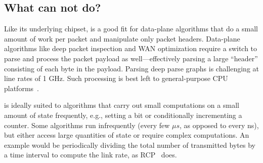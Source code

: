 \subsection{What can \absmachine not do?}
\label{ss:limitations}

Like its underlying chipset, \absmachine is a good fit for data-plane
algorithms that do a small amount of work per packet and manipulate
only packet headers. Data-plane algorithms like deep packet inspection
and WAN optimization require a switch to parse and process the packet
payload as well---effectively parsing a large ``header'' consisting of
each byte in the payload. Parsing deep parse graphs is challenging at
line rates of 1 GHz. Such processing is best left to general-purpose
CPU platforms~\cite{e2, aplomb, opennf}.

\absmachine is ideally suited to algorithms that carry out small
computations on a small amount of state frequently, e.g., setting a
bit or conditionally incrementing a counter. Some algorithms run
infrequently (every few $\mu s$, as opposed to every ns), but either
access large quantities of state or require complex computations. An
example would be periodically dividing the total number of transmitted
bytes by a time interval to compute the link rate, as RCP~\cite{rcp}
does. 
